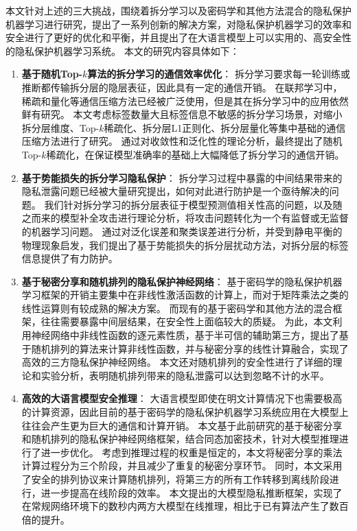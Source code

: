 本文针对上述的三大挑战，围绕着拆分学习以及密码学和其他方法混合的隐私保护机器学习进行研究，提出了一系列创新的解决方案，对隐私保护机器学习的效率和安全进行了更好的优化和平衡，并且提出了在大语言模型上可以实用的、高安全性的隐私保护机器学习系统。
%
本文的研究内容具体如下：
%
\begin{enumerate}
    \item \textbf{基于随机Top-$k$算法的拆分学习的通信效率优化}：
    拆分学习要求每一轮训练或推断都传输拆分层的隐层表征，因此具有一定的通信开销。
    在联邦学习中，稀疏和量化等通信压缩方法已经被广泛使用，但是其在拆分学习中的应用依然鲜有研究。
    本文考虑标签数量大且标签信息不敏感的拆分学习场景，对缩小拆分层维度、Top-$k$稀疏化、拆分层L1正则化、拆分层量化等集中基础的通信压缩方法进行了研究。
    通过对收敛性和泛化性的理论分析，最终提出了随机Top-$k$稀疏化，在保证模型准确率的基础上大幅降低了拆分学习的通信开销。
    
    \item \textbf{基于势能损失的拆分学习隐私保护}：
    拆分学习过程中暴露的中间结果带来的隐私泄露问题已经被大量研究提出，如何对此进行防护是一个亟待解决的问题。
    我们针对拆分学习的拆分层表征于模型预测值相关性高的问题，以及随之而来的模型补全攻击进行理论分析，将攻击问题转化为一个有监督或无监督的机器学习问题。
    通过对泛化误差和聚类误差进行分析，并受到静电平衡的物理现象启发，我们提出了基于势能损失的拆分层扰动方法，对拆分层的标签信息提供了有力防护。
    \item \textbf{基于秘密分享和随机排列的隐私保护神经网络}：
    基于密码学的隐私保护机器学习框架的开销主要集中在非线性激活函数的计算上，而对于矩阵乘法之类的线性运算则有较成熟的解决方案。
    而现有的基于密码学和其他方法的混合框架，往往需要暴露中间层结果，在安全性上面临较大的质疑。
    为此，本文利用神经网络中非线性函数的逐元素性质，基于半可信的辅助第三方，提出了基于随机排列的算法来计算非线性函数，并与秘密分享的线性计算融合，实现了高效的三方隐私保护神经网络。
    本文还对随机排列的安全性进行了详细的理论和实验分析，表明随机排列带来的隐私泄露可以达到忽略不计的水平。
 
    \item \textbf{高效的大语言模型安全推理}：
    大语言模型即使在明文计算情况下也需要极高的计算资源，因此目前的基于密码学的隐私保护机器学习系统应用在大模型上往往会产生更为巨大的通信和计算开销。
    本文基于此前研究的基于秘密分享和随机排列的隐私保护神经网络框架，结合同态加密技术，针对大模型推理进行了进一步优化。
    考虑到推理过程的权重是恒定的，本文将秘密分享的乘法计算过程分为三个阶段，并且减少了重复的秘密分享环节。
    同时，本文采用了安全的排列协议来计算随机排列，将第三方的所有工作转移到离线阶段进行，进一步提高在线阶段的效率。
    本文提出的大模型隐私推断框架，实现了在常规网络环境下的数秒内两方大模型在线推理，相比于已有算法产生了数百倍的提升。
\end{enumerate}